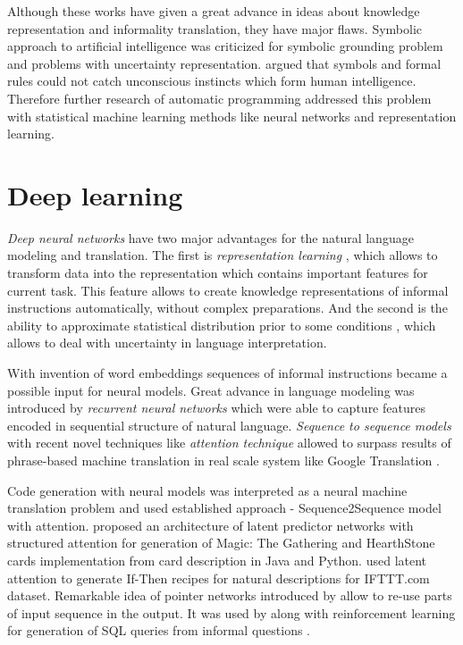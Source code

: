 Although these works have given a great advance in ideas about knowledge representation and informality translation, they have major flaws. Symbolic approach to artificial intelligence was criticized \parencite{mcdermott1987critique, harnad1990symbol} for symbolic grounding problem and problems with uncertainty representation. \cite{dreyfus1994computers} argued that symbols and formal rules could not catch unconscious instincts which form human intelligence. Therefore further research of automatic programming addressed this problem with statistical machine learning methods like neural networks and representation learning.

\section{Deep learning} 
\emph{Deep neural networks} have two major advantages for the natural language modeling and translation. The first is \emph{representation learning} \parencite{Bengio2013}, which allows to transform data into the representation which contains important features for current task. This feature allows to create knowledge representations of informal instructions automatically, without complex preparations. And the second is the ability to approximate statistical distribution prior to some conditions \parencite{white1992artificial}, which allows to deal with uncertainty in language interpretation. 

With invention of word embeddings \parencite{bengio2003neural} sequences of informal instructions became a possible input for neural models. Great advance in language modeling was introduced by \emph{recurrent neural networks} \parencite{sundermeyer2012lstm, hochreiter1997long, Jozefowicz2016, Gers2001} which were able to capture features encoded in sequential structure of natural language. \emph{Sequence to sequence models} \parencite{NIPS2014_5346} with recent novel techniques like \emph{attention technique} \parencite{Luong2015, Jean2014, Bahdanau2014} allowed to surpass results of phrase-based machine translation in real scale system like Google Translation \parencite{Wu2016}. 

Code generation with neural models was interpreted as a neural machine translation problem and used established approach - Sequence2Sequence model with attention. \cite{Ling2016} proposed an architecture of latent predictor networks with structured attention for generation of Magic: The Gathering and HearthStone cards implementation from card description in Java and Python. \cite{Chen2016} used latent attention to generate If-Then recipes for natural descriptions for IFTTT.com dataset. Remarkable idea of pointer networks introduced by \cite{NIPS2015_5866} allow to re-use parts of input sequence in the output. It was used by \cite{Zhong2017} along with reinforcement learning for generation of SQL queries from informal questions \cite{Bhoopchand2016}. 

